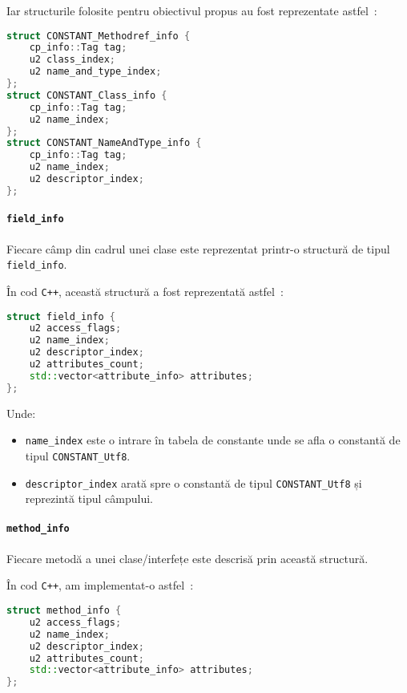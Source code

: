 Iar structurile folosite pentru obiectivul propus au fost reprezentate
astfel~\cite{classfile_sections}:

\begin{lstlisting}[language=C++]
struct CONSTANT_Methodref_info {
    cp_info::Tag tag;
    u2 class_index;
    u2 name_and_type_index;
};
struct CONSTANT_Class_info {
    cp_info::Tag tag;
    u2 name_index;
};
struct CONSTANT_NameAndType_info {
    cp_info::Tag tag;
    u2 name_index;
    u2 descriptor_index;
};
\end{lstlisting}

\paragraph{\texorpdfstring{\texttt{field\_info}}{field\_info}}\label{field_info}

Fiecare câmp din cadrul unei clase este reprezentat printr-o structură
de tipul \texttt{field\_info}.

În cod \texttt{C++}, această structură a fost reprezentată astfel~\cite{classfile_sections}:

\begin{lstlisting}[language=C++]
struct field_info {
    u2 access_flags;
    u2 name_index;
    u2 descriptor_index;
    u2 attributes_count;
    std::vector<attribute_info> attributes;
};
\end{lstlisting}

Unde:
\begin{itemize}
	\item \texttt{name\_index} este o intrare în tabela de constante unde se afla o constantă de tipul \texttt{CONSTANT\_Utf8}.
	\item \texttt{descriptor\_index} arată spre o constantă de tipul \texttt{CONSTANT\_Utf8} și reprezintă tipul câmpului.
\end{itemize}

\paragraph{\texorpdfstring{\texttt{method\_info}}{method\_info}}\label{method_info}

Fiecare metodă a unei clase/interfețe este descrisă prin această
structură.

În cod \texttt{C++}, am implementat-o astfel~\cite{classfile_sections}:

\begin{lstlisting}[language=C++]
struct method_info {
    u2 access_flags;
    u2 name_index;
    u2 descriptor_index;
    u2 attributes_count;
    std::vector<attribute_info> attributes;
};
\end{lstlisting}

